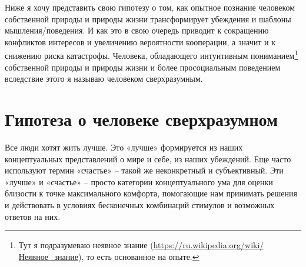 \documentclass[12pt,a4paper]{report}
\begin{document}
\noindent Ниже я хочу представить свою гипотезу о том, как опытное познание человеком собственной природы и природы жизни трансформирует убеждения и шаблоны мышления\hspace{.05em}/\hspace{.05em}поведения. И как это в свою очередь приводит к сокращению конфликтов интересов и увеличению вероятности кооперации, а значит и к снижению риска катастрофы. Человека, обладающего интуитивным пониманием\footnote{Тут я подразумеваю неявное знание (\href{https://ru.wikipedia.org/wiki/\%D0\%9D\%D0\%B5\%D1\%8F\%D0\%B2\%D0\%BD\%D0\%BE\%D0\%B5_\%D0\%B7\%D0\%BD\%D0\%B0\%D0\%BD\%D0\%B8\%D0\%B5}{https://ru.wikipedia.org/wiki/Неявное\_знание}), то есть основанное на опыте.} собственной природы и природы жизни и более просоциальным поведением вследствие этого я называю человеком сверхразумным.

\section*{Гипотеза о человеке сверхразумном}

Все люди хотят жить лучше. Это «лучше» формируется из наших концептуальных представлений о мире и себе, из наших убеждений. Еще часто используют термин «счастье» -- такой же неконкретный и субъективный. Эти «лучше» и «счастье» -- просто категории концептуального ума для оценки близости к точке максимального комфорта, помогающие нам принимать решения и действовать в условиях бесконечных комбинаций стимулов и возможных ответов на них.
\end{document}
